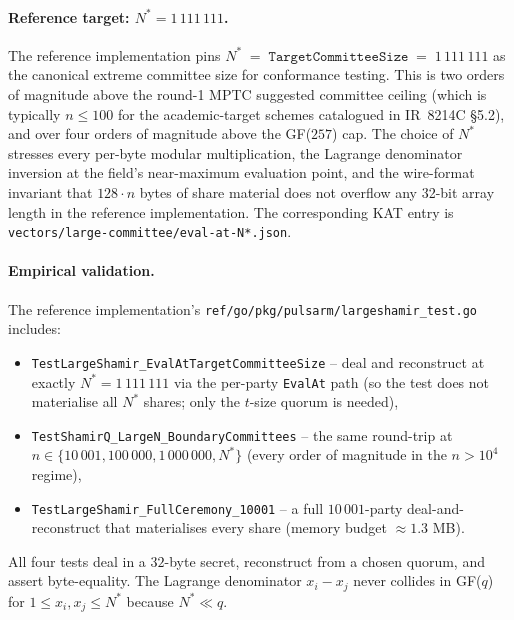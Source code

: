 \documentclass[11pt,a4paper]{article}
\theoremstyle{definition}
\theoremstyle{remark}
\begin{document}
\paragraph{Reference target: $N^* = 1\,111\,111$.}
The reference implementation pins
\(
N^* \;=\; \mathtt{TargetCommitteeSize} \;=\; 1\,111\,111
\)
as the canonical extreme committee size for conformance testing.
This is two orders of magnitude above the round-1 MPTC suggested
committee ceiling (which is typically $n \le 100$ for the
academic-target schemes catalogued in IR~8214C \S5.2), and over
four orders of magnitude above the GF($257$) cap. The choice of
$N^*$ stresses every per-byte modular multiplication, the Lagrange
denominator inversion at the field's near-maximum evaluation
point, and the wire-format invariant that $128 \cdot n$ bytes of
share material does not overflow any 32-bit array length in the
reference implementation. The corresponding KAT entry is
\texttt{vectors/large-committee/eval-at-N*.json}.

\paragraph{Empirical validation.}
The reference implementation's
\texttt{ref/go/pkg/pulsarm/largeshamir\_test.go} includes:

\begin{itemize}[leftmargin=*, itemsep=0pt]
\item \texttt{TestLargeShamir\_EvalAtTargetCommitteeSize} -- deal and
reconstruct at exactly $N^* = 1\,111\,111$ via the per-party
\texttt{EvalAt} path (so the test does not materialise all
$N^*$ shares; only the $t$-size quorum is needed),
\item \texttt{TestShamirQ\_LargeN\_BoundaryCommittees} -- the same
round-trip at $n \in \{10\,001, 100\,000, 1\,000\,000, N^*\}$
(every order of magnitude in the $n > 10^4$ regime),
\item \texttt{TestLargeShamir\_FullCeremony\_10001} -- a full
$10\,001$-party deal-and-reconstruct that materialises every
share (memory budget $\approx 1.3$ MB).
\end{itemize}

All four tests deal in a $32$-byte secret, reconstruct from a
chosen quorum, and assert byte-equality. The Lagrange denominator
$x_i - x_j$ never collides in GF($q$) for $1 \le x_i, x_j \le N^*$
because $N^* \ll q$.
\end{document}
